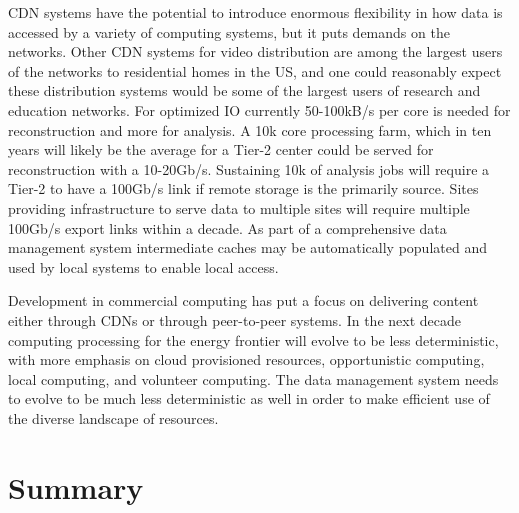 CDN systems have the potential to introduce enormous flexibility in how data is accessed by a variety of computing systems, but it puts demands on the networks.   Other CDN systems for video distribution are among the largest users of the networks to residential homes in the US, and one could reasonably expect these distribution systems would be some of the largest users of research and education networks.   For optimized IO currently 50-100kB/s per core is needed for reconstruction and more for analysis.   A 10k core processing farm, which in ten years will likely be the average for a Tier-2 center could be served for reconstruction with a 10-20Gb/s.    Sustaining 10k of analysis jobs will require a Tier-2 to have a 100Gb/s link if remote storage is the primarily source.   Sites providing infrastructure to serve data to multiple sites will require multiple 100Gb/s export links within a decade.  As part of a comprehensive data management system intermediate caches may be automatically populated and used by local systems to enable local access.   

Development in commercial computing has put a focus on delivering content either through CDNs or through peer-to-peer systems.    In the next decade computing processing for the energy frontier will evolve to be less deterministic, with more emphasis on cloud provisioned resources, opportunistic computing, local computing, and volunteer computing.    The data management system needs to evolve to be much less deterministic as well in order to make efficient use of the diverse landscape of resources. 


\section{Summary}
\label{sec:comp-summary}





